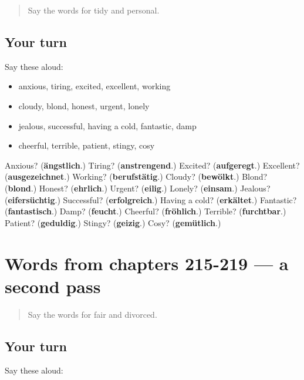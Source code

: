 \begin{quote}
Say the words for tidy and personal.
\end{quote}

\subsection*{Your turn}
Say these aloud:

\begin{itemize}
\raggedright
  \item anxious, tiring, excited, excellent, working
  \item cloudy, blond, honest, urgent, lonely
  \item jealous, successful, having a cold, fantastic, damp
  \item cheerful, terrible, patient, stingy, cosy
\end{itemize}

\begin{tcolorbox}[breakable,colback=teal!4,colframe=teal!35!black,title={Before you move on}]
Anxious? (\textbf{ängstlich}.) Tiring? (\textbf{anstrengend}.) Excited? (\textbf{aufgeregt}.) Excellent? (\textbf{ausgezeichnet}.) Working? (\textbf{berufstätig}.) Cloudy? (\textbf{bewölkt}.) Blond? (\textbf{blond}.) Honest? (\textbf{ehrlich}.) Urgent? (\textbf{eilig}.) Lonely? (\textbf{einsam}.) Jealous? (\textbf{eifersüchtig}.) Successful? (\textbf{erfolgreich}.) Having a cold? (\textbf{erkältet}.) Fantastic? (\textbf{fantastisch}.) Damp? (\textbf{feucht}.) Cheerful? (\textbf{fröhlich}.) Terrible? (\textbf{furchtbar}.) Patient? (\textbf{geduldig}.) Stingy? (\textbf{geizig}.) Cosy? (\textbf{gemütlich}.)
\end{tcolorbox}
\section[(dialogue)]{Words from chapters 215-219 — a second pass}

\label{lesson:GE-R219-second-pass-words-from-chapters-215-219}



\begin{quote}
Say the words for fair and divorced.
\end{quote}

\subsection*{Your turn}
Say these aloud:

